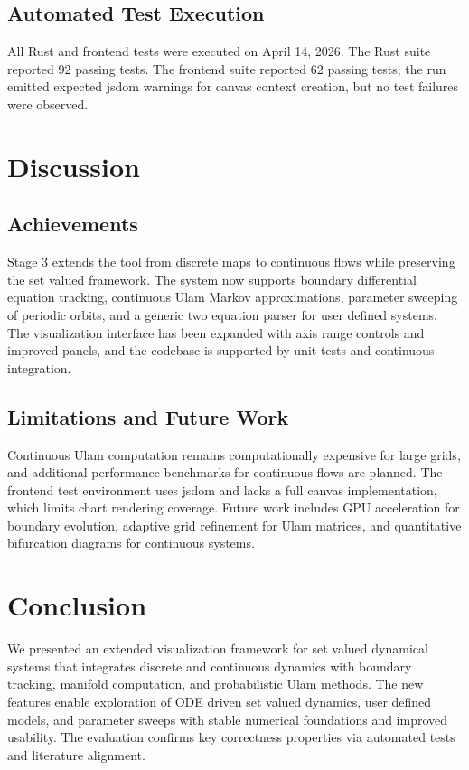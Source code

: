 \documentclass[11pt,twocolumn]{article}
\begin{document}
\subsection{Automated Test Execution}
All Rust and frontend tests were executed on April 14, 2026. The Rust suite reported 92 passing tests. The frontend suite reported 62 passing tests; the run emitted expected jsdom warnings for canvas context creation, but no test failures were observed.

\section{Discussion}
\subsection{Achievements}
Stage 3 extends the tool from discrete maps to continuous flows while preserving the set valued framework. The system now supports boundary differential equation tracking, continuous Ulam Markov approximations, parameter sweeping of periodic orbits, and a generic two equation parser for user defined systems. The visualization interface has been expanded with axis range controls and improved panels, and the codebase is supported by unit tests and continuous integration.

\subsection{Limitations and Future Work}
Continuous Ulam computation remains computationally expensive for large grids, and additional performance benchmarks for continuous flows are planned. The frontend test environment uses jsdom and lacks a full canvas implementation, which limits chart rendering coverage. Future work includes GPU acceleration for boundary evolution, adaptive grid refinement for Ulam matrices, and quantitative bifurcation diagrams for continuous systems.

\section{Conclusion}
We presented an extended visualization framework for set valued dynamical systems that integrates discrete and continuous dynamics with boundary tracking, manifold computation, and probabilistic Ulam methods. The new features enable exploration of ODE driven set valued dynamics, user defined models, and parameter sweeps with stable numerical foundations and improved usability. The evaluation confirms key correctness properties via automated tests and literature alignment.
\end{document}
